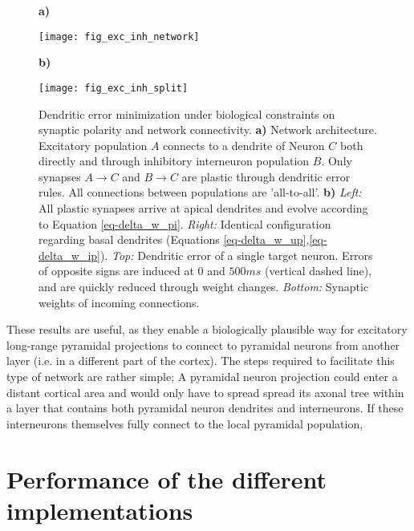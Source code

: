\begin{figure}[t]
    \centering
    \begin{minipage}{0.2\textwidth}
        \textbf{a)}\par\medskip
        \centering
        \texttt{[image: fig\_exc\_inh\_network]}
    \end{minipage}\hfill
    \begin{minipage}{0.7\textwidth}
        \textbf{b)}\par\medskip
        \centering
        \texttt{[image: fig\_exc\_inh\_split]}
    \end{minipage}
    \caption{Dendritic error minimization under biological constraints on synaptic polarity and network connectivity. 
    \textbf{a)} Network architecture. Excitatory population $A$ connects to a dendrite of Neuron $C$ both directly
    and through inhibitory interneuron population $B$. Only synapses $A\rightarrow C$ and $B \rightarrow C$ are plastic 
    through dendritic error rules. All connections between populations are 'all-to-all'\phrasing. \textbf{b)}
        \textit{Left:} All plastic synapses arrive at apical dendrites and evolve according to Equation
        \ref{eq-delta_w_pi}. \textit{Right:} Identical configuration regarding basal dendrites (Equations
        \ref{eq-delta_w_up},\ref{eq-delta_w_ip}). \textit{Top:} Dendritic error of a single target neuron. Errors of
        opposite signs are induced at $0$ and $500ms$ (vertical dashed line), and are quickly reduced
        through weight changes. \textit{Bottom:} Synaptic weights of incoming connections.}
    \label{fig-exc-inh-split}
\end{figure}

These results are useful, as they enable a biologically plausible way for excitatory long-range pyramidal projections to
connect to pyramidal neurons from another layer (i.e. in a different part of the cortex). The steps required to
facilitate this type of network are rather simple; A pyramidal neuron projection could enter a distant cortical area and
would only have to spread spread its axonal tree \phrasing within a layer that contains both pyramidal neuron dendrites 
and interneurons. If these interneurons themselves fully connect to the local pyramidal population, 



\section{Performance of the different implementations}

